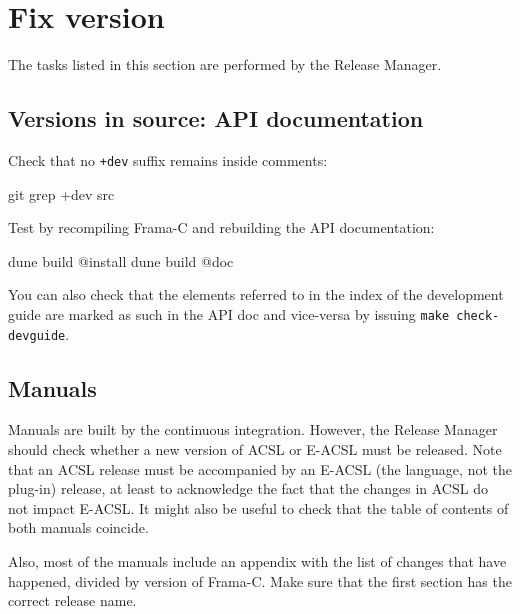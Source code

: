 \section{Fix version}
\label{sec:validation:version}

The tasks listed in this section are performed by the Release Manager.

\subsection{Versions in source: API documentation}

Check that no \verb|+dev| suffix remains inside comments:

\begin{shell}
git grep +dev src
\end{shell}

Test by recompiling Frama-C and rebuilding the API documentation:
\begin{shell}
dune build @install
dune build @doc
\end{shell}

You can also check that the elements referred to in the index of the
development guide are marked as such in the API doc and vice-versa
by issuing \texttt{make check-devguide}.

\subsection{Manuals}

Manuals are built by the continuous integration. However, the Release Manager
should check whether a new version of ACSL or E-ACSL must be released. Note that
an ACSL release must be accompanied by an E-ACSL (the language, not the plug-in)
release, at least to acknowledge the fact that the changes in ACSL do not impact
E-ACSL. It might also be useful to check that the table of contents of both manuals
coincide.

Also, most of the manuals include an appendix with the list of changes that have
happened, divided by version of Frama-C. Make sure that the first section has
the correct release name.

